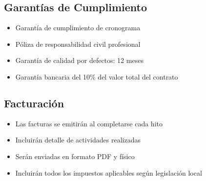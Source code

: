 \subsection{Garantías de Cumplimiento}
\begin{itemize}
    \item Garantía de cumplimiento de cronograma
    \item Póliza de responsabilidad civil profesional
    \item Garantía de calidad por defectos: 12 meses
    \item Garantía bancaria del 10\% del valor total del contrato
\end{itemize}

\subsection{Facturación}
\begin{itemize}
    \item Las facturas se emitirán al completarse cada hito
    \item Incluirán detalle de actividades realizadas
    \item Serán enviadas en formato PDF y físico
    \item Incluirán todos los impuestos aplicables según legislación local
\end{itemize}